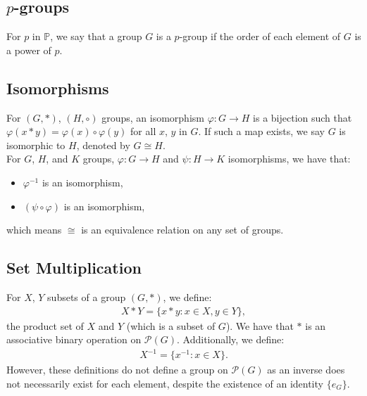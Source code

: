 \subsection{$p$-groups}

For $p$ in $\mathbb{P}$, we say that a group $G$ is a $p$-group if the order
of each element of $G$ is a power of $p$.

\subsection{Isomorphisms}

For $(G, \ast)$, $(H, \circ)$ groups, an isomorphism $\varphi : G \to H$ is a
bijection such that $\varphi(x \ast y) = \varphi(x) \circ \varphi(y)$ for all
$x$, $y$ in $G$. If such a map exists, we say $G$ is isomorphic to $H$, denoted
by $G \cong H$.
\\[\baselineskip]
For $G$, $H$, and $K$ groups, $\varphi : G \to H$ and $\psi : H \to K$ isomorphisms,
we have that: \begin{itemize}
    \item $\varphi^{-1}$ is an isomorphism,
    \item $(\psi \circ \varphi)$ is an isomorphism,
\end{itemize} which means $\cong$ is an equivalence relation on any set of groups.

\subsection{Set Multiplication}

For $X$, $Y$ subsets of a group $(G, \ast)$, we define: \begin{align*}
    X \ast Y = \{x \ast y : x \in X, y \in Y\},
\end{align*} the product set of $X$ and $Y$ (which is a subset of $G$).
We have that $\ast$ is an associative binary operation on 
$\mathcal{P}(G)$. Additionally, we define: \begin{align*}
    X^{-1} = \{x^{-1} : x \in X\}.
\end{align*} However, these definitions do not define a group on
$\mathcal{P}(G)$ as an inverse does not necessarily exist for each
element, despite the existence of an identity $\{e_G\}$.
